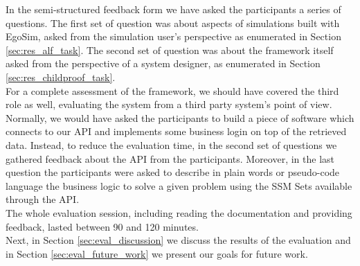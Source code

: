 In the semi-structured feedback form we have asked the participants a series of questions. The first set of question was about aspects of simulations built with EgoSim, asked from the simulation user's perspective as enumerated in Section \ref{sec:res_alf_task}. The second set of question was about the framework itself asked from the perspective of a system designer, as enumerated in Section \ref{sec:res_childproof_task}.\\

For a complete assessment of the framework, we should have covered the third role as well, evaluating the system from a third party system's point of view. Normally, we would have asked the participants to build a piece of software which connects to our API and implements some business login on top of the retrieved data. Instead, to reduce the evaluation time, in the second set of questions we gathered feedback about the API from the participants. Moreover, in the last question the participants were asked to describe in plain words or pseudo-code language the business logic to solve a given problem using the SSM Sets available through the API.\\

The whole evaluation session, including reading the documentation and providing feedback, lasted between 90 and 120 minutes.\\

Next, in Section \ref{sec:eval_discussion} we discuss the results of the evaluation and in Section \ref{sec:eval_future_work} we present our goals for future work.\\
